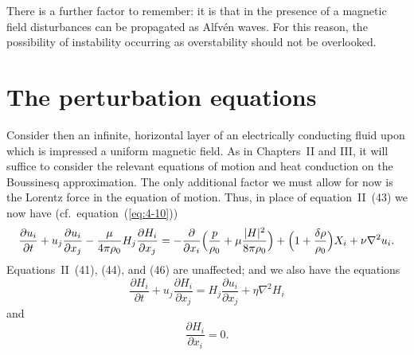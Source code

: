 There is a further factor to remember: it is that in the presence of a magnetic field disturbances can be propagated as Alfv\'en waves. For this reason, the possibility of instability occurring as overstability should not be overlooked.

\section{The perturbation equations}\label{sec:42}

Consider then an infinite, horizontal layer of an electrically conducting fluid upon which is impressed a uniform magnetic field. As in Chapters~II and III, it will suffice to consider the relevant equations of motion and heat conduction on the Boussinesq approximation. The only additional factor we must allow for now is the Lorentz force in the equation of motion. Thus, in place of equation~II~(43) we now have (cf.\ equation~(\ref{eq:4-10}))
\begin{equation}
\label{eq:4-84}
\frac{\partial u_i}{\partial t}+u_j\frac{\partial u_i}{\partial x_j}-\frac{\mu}{4\pi\rho_0}H_j\frac{\partial H_i}{\partial x_j} = -\frac{\partial}{\partial x_i}\Bigl(\frac{p}{\rho_0}+\mu\frac{|\mathbf{H}|^2}{8\pi\rho_0}\Bigr)+\Bigl(1+\frac{\delta\rho}{\rho_0}\Bigr)\mathbf{X}_i+\nu\nabla^2 u_i.
\end{equation}
Equations~II~(41), (44), and (46) are unaffected; and we also have the equations
\begin{equation}
\label{eq:4-85}
\frac{\partial H_i}{\partial t}+u_j\frac{\partial H_i}{\partial x_j} = H_j\frac{\partial u_i}{\partial x_j}+\eta\nabla^2 H_i
\end{equation}
and
\begin{equation}
\label{eq:4-86}
\frac{\partial H_i}{\partial x_i} = 0.
\end{equation}

